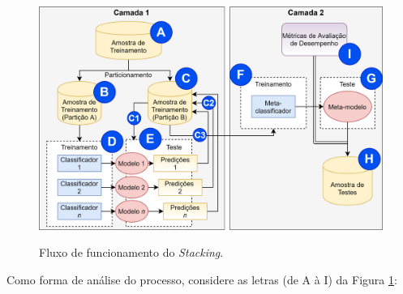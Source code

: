 \begin{figure}[H]
\centering
\caption{Fluxo de funcionamento do \textit{Stacking}.} \includegraphics[width=\textwidth,keepaspectratio]{figs/processo_Stacking_corrigido.png}
\newline {}\label{fig:processo_Stacking}
\end{figure}

Como forma de análise do processo, considere as letras (de A à I) da Figura \ref{fig:processo_Stacking}:

